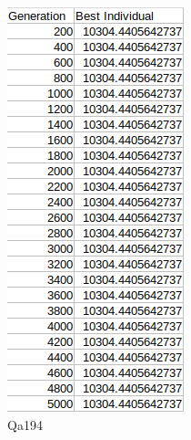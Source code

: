 \documentclass[11pt,a4paper,titlepage]{article}
\begin{document}
\begin{figure}[ht]
	\begin{subfigure}{.32\textwidth}
		\centering
		\includegraphics[width=.75\textwidth]{MultQa194}
		\caption{Qa194}
	\end{subfigure}
	\begin{subfigure}{.32\textwidth}
		\centering		

\end{subfigure}
\end{figure}
\end{document}
